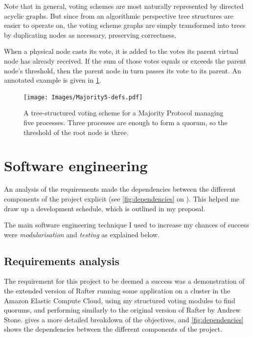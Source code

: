 \documentclass[12pt,chapterprefix=true,toc=bibliography,numbers=noendperiod,
               footnotes=multiple,twoside]{scrreprt}
\begin{document}
Note that in general, voting schemes are most naturally represented by directed acyclic graphs. But since from an algorithmic perspective tree structures are easier to operate on, the voting scheme graphs are simply transformed into trees by duplicating nodes as necessary, preserving correctness.

When a physical node casts its vote, it is added to the votes its parent virtual node has already received. If the sum of those votes equals or exceeds the parent node's threshold, then the parent node in turn passes its vote to its parent. An annotated example is given in \cref{fig:majority5-defs}.

\begin{figure}[h]
    \centering
    \texttt{[image: Images/Majority5-defs.pdf]}
    \caption[Tree-structured voting scheme for a Majority Protocol]{A tree-structured voting scheme for a Majority Protocol managing five processes. Three processes are enough to form a quorum, so the threshold of the root node is three.}
    \label{fig:majority5-defs}
\end{figure}

\section{Software engineering}
\label{sc:software-engineering}

An analysis of the requirements made the dependencies between the different components of the project explicit (see \cref{fig:dependencies} on ). This helped me draw up a development schedule, which is outlined in my proposal.

The main software engineering technique I used to increase my chances of success were \emph{modularisation} and \emph{testing} as explained below.

\subsection{Requirements analysis}
\label{sc:requirements-analysis}

The requirement for this project to be deemed a success was a demonstration of the extended version of Rafter running some application on a cluster in the Amazon Elastic Compute Cloud, using my structured voting modules to find quorums, and performing similarly to the original version of Rafter by Andrew Stone.  gives a more detailed breakdown of the objectives, and \cref{fig:dependencies} shows the dependencies between the different components of the project.
\end{document}

